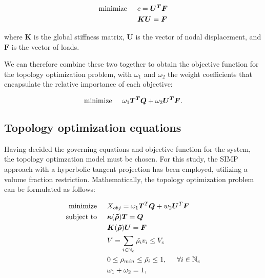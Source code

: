 \documentclass[../main.tex]{subfiles}
\begin{document}
\begin{align}
  \text{minimize} \hspace{0.5cm} & c = \bm{U^T} \bm{F} \\
            & \bm{K} \bm{U} = \bm{F}
\end{align}

where $\bm{K}$ is the global stiffness matrix, $\bm{U}$ is the vector of nodal displacement, and $\bm{F}$ is the vector of loads.

We can therefore combine these two together to obtain the objective function for the topology optimization problem, with $\omega_1$ and $\omega_2$ the weight coefficients that encapsulate the relative importance of each objective:

\begin{equation}
  \text{minimize} \hspace{0.5cm} \omega_1 \bm{T^T} \bm{Q} + \omega_2 \bm{U^T} \bm{F}.
\end{equation}

\subsection{Topology optimization equations}

Having decided the governing equations and objective function for the system, the topology optimzation model must be chosen. For this study, the SIMP approach with a hyperbolic tangent projection has been employed, utilizing a volume fraction restriction. Mathematically, the topology optimization problem can be formulated as follows:

\begin{align}
  \text{minimize}  & \hspace{0.5cm} X_{obj} = \omega_1 \bm{T}^T \bm{Q} + w_2 \bm{U}^T \bm{F}  \\ 
  \text{subject to} & \hspace{0.5cm} \bm{\kappa}(\bm{\tilde{\rho}}) \bm{T} = \bm{Q} \\
                    &  \hspace{0.5cm} \bm{K}(\bm{\tilde{\rho}}){\bm{U}} = \bm{F} \\
    & \hspace{0.5cm} V = \sum _{i \in \mathbb{N}_e } \tilde{\rho_i} v_i \leq V_c  \\ 
    & \hspace{0.5cm} 0 \leq \rho_{min} \leq \tilde{\rho_i} \leq 1, \hspace{0.5cm} \forall i \in \mathbb{N}_e  \\
    & \hspace{0.5cm} \omega_1 + \omega_2 = 1,  
 \end{align}
\end{document}
